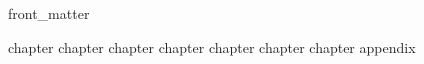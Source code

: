 \documentclass{ucbthesis}
\begin{document}
{front_matter}

\pagestyle{headings}
{chapter}
{chapter}
{chapter}
{chapter}
{chapter}
{chapter}
{chapter}
{appendix}


\nocite{}


\end{document}
